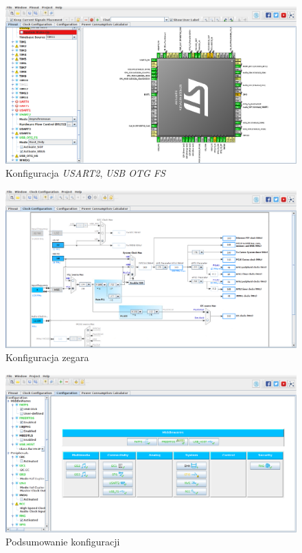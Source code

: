 \documentclass[12pt,a4paper]{article}
\begin{document}
\begin{figure}[H]
 \centerline{\includegraphics[width=\textwidth]{img/img3}}
 \caption{Konfiguracja \emph{USART2}, \emph{USB OTG FS}}
 \label{img3}
\end{figure}

\begin{figure}[H]
 \centerline{\includegraphics[width=\textwidth]{img/img4}}
 \caption{Konfiguracja zegara}
 \label{img4}
\end{figure}

\begin{figure}[H]
 \centerline{\includegraphics[width=\textwidth]{img/img5}}
 \caption{Podsumowanie konfiguracji}
 \label{img5}
\end{figure}
\end{document}
